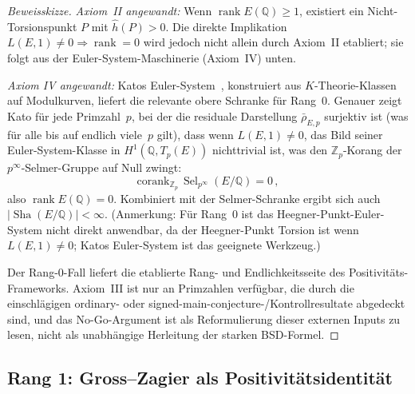 \documentclass[aps,prd,twocolumn,superscriptaddress,nofootinbib,floatfix]{revtex4-2}
\theoremstyle{definition}
\theoremstyle{remark}
\DeclareMathOperator{\rank}{rank}
\DeclareMathOperator{\Sel}{Sel}
\DeclareMathOperator{\Sha}{Sha}
\begin{document}
\begin{proof}[Beweisskizze]
\textit{Axiom~II angewandt:} Wenn $\rank E(\mathbb{Q}) \geq 1$, existiert ein Nicht-Torsionspunkt $P$ mit $\hat{h}(P) > 0$. Die direkte Implikation $L(E,1) \neq 0 \Rightarrow \rank = 0$ wird jedoch nicht allein durch Axiom~II etabliert; sie folgt aus der Euler-System-Maschinerie (Axiom~IV) unten.

\textit{Axiom IV angewandt:} Katos Euler-System~\cite{Kato2004}, konstruiert aus $K$-Theorie-Klassen auf Modulkurven, liefert die relevante obere Schranke für Rang~0. Genauer zeigt Kato für jede Primzahl~$p$, bei der die residuale Darstellung $\bar{\rho}_{E,p}$ surjektiv ist (was für alle bis auf endlich viele~$p$ gilt), dass wenn $L(E,1) \neq 0$, das Bild seiner Euler-System-Klasse in $H^1(\mathbb{Q}, T_p(E))$ nichttrivial ist, was den $\mathbb{Z}_p$-Korang der $p^\infty$-Selmer-Gruppe auf Null zwingt:
\begin{equation}
\mathrm{corank}_{\mathbb{Z}_p}\, \Sel_{p^\infty}(E/\mathbb{Q}) = 0\,,
\end{equation}
also $\rank E(\mathbb{Q}) = 0$. Kombiniert mit der Selmer-Schranke ergibt sich auch $|\Sha(E/\mathbb{Q})| < \infty$. (Anmerkung: Für Rang~0 ist das Heegner-Punkt-Euler-System nicht direkt anwendbar, da der Heegner-Punkt Torsion ist wenn $L(E,1) \neq 0$; Katos Euler-System ist das geeignete Werkzeug.)

Der Rang-0-Fall liefert die etablierte Rang- und Endlichkeitsseite des Positivitäts-Frameworks. Axiom~III ist nur an Primzahlen verfügbar, die durch die einschlägigen ordinary- oder signed-main-conjecture-/Kontrollresultate abgedeckt sind, und das No-Go-Argument ist als Reformulierung dieser externen Inputs zu lesen, nicht als unabhängige Herleitung der starken BSD-Formel.
\end{proof}

\subsection{Rang 1: Gross--Zagier als Positivitätsidentität}
\end{document}
